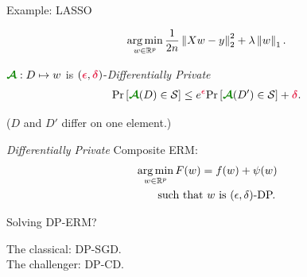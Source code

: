 \documentclass{beamer}
\begin{document}
\begin{frame}
  \begin{center}
    \Huge Example: LASSO
  \end{center}
  \begin{align*}
    \operatorname*{arg\,min}_{w \in \mathbb R^p} \frac{1}{2n} \left \lVert Xw - y \right \rVert_2^2 + \lambda \left \lVert w \right \rVert_1.
  \end{align*}

  \pause



\end{frame}

\begin{frame}
  \vspace{2em}

  $\emphcolb{\cA} : D \mapsto w$ is
  $(\emphcol{\epsilon}, \emphcol{\delta})$-\emph{Differentially
    Private}
  \begin{align*}
    \prob{\emphcolb{\cA}(D) \in \cS} \le e^{\emphcol{\epsilon}} \prob{\emphcolb{\cA}(D') \in \cS} + \emphcol{\delta}.
  \end{align*}

  \vspace{1em}

  \begin{flushright}
    ($D$ and $D'$ differ on one element.)
  \end{flushright}

\end{frame}

\begin{frame}
  \vspace{2em}

  \emph{Differentially Private} Composite ERM:
  \begin{align*}
    & \operatorname*{arg\,min}_{w \in \mathbb R^p}  F(w) = f(w) + \psi(w)\\
    & \qquad \text{such that $w$ is $(\epsilon, \delta)$-DP.}
  \end{align*}

\end{frame}

\begin{frame}
  \Huge\centering
  Solving DP-ERM?


  \vspace{1em}
  \pause
  \Large
  The classical: DP-SGD. \pause \\
  The challenger: DP-CD.
\end{frame}
\end{document}
